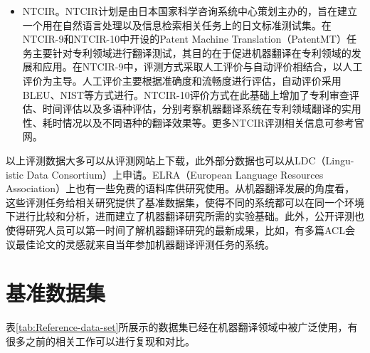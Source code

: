 \begin{appendices}
\begin{itemize}
\vspace{0.5em}
\item NTCIR。NTCIR计划是由日本国家科学咨询系统中心策划主办的，旨在建立一个用在自然语言处理以及信息检索相关任务上的日文标准测试集。在NTCIR-9和NTCIR-10中开设的Patent Machine Translation（PatentMT）任务主要针对专利领域进行翻译测试，其目的在于促进机器翻译在专利领域的发展和应用。在NTCIR-9中，评测方式采取人工评价与自动评价相结合，以人工评价为主导。人工评价主要根据准确度和流畅度进行评估，自动评价采用BLEU、NIST等方式进行。NTCIR-10评价方式在此基础上增加了专利审查评估、时间评估以及多语种评估，分别考察机器翻译系统在专利领域翻译的实用性、耗时情况以及不同语种的翻译效果等。更多NTCIR评测相关信息可参考官网。
\end{itemize}

\parinterval 以上评测数据大多可以从评测网站上下载，此外部分数据也可以从LDC（Lingu-istic Data Consortium）上申请。ELRA（European Language Resources Association）上也有一些免费的语料库供研究使用。从机器翻译发展的角度看，这些评测任务给相关研究提供了基准数据集，使得不同的系统都可以在同一个环境下进行比较和分析，进而建立了机器翻译研究所需的实验基础。此外，公开评测也使得研究人员可以第一时间了解机器翻译研究的最新成果，比如，有多篇ACL会议最佳论文的灵感就来自当年参加机器翻译评测任务的系统。


\section{基准数据集}
\parinterval 表\ref{tab:Reference-data-set}所展示的数据集已经在机器翻译领域中被广泛使用，有很多之前的相关工作可以进行复现和对比。


\end{appendices}
